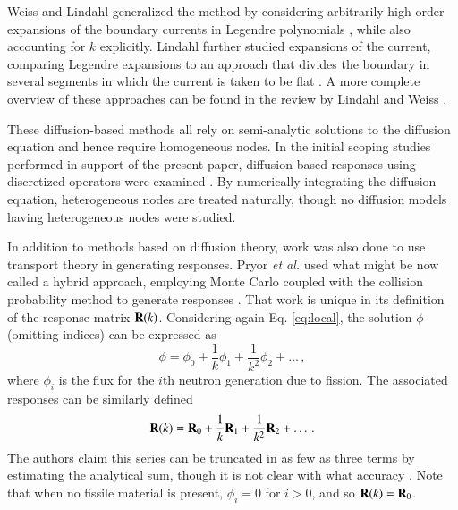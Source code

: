 Weiss and Lindahl generalized the method by considering
arbitrarily high order expansions of the boundary
currents in Legendre polynomials \cite{weiss1975hor}, while also accounting 
for $k$ explicitly.
Lindahl further studied expansions of the current,
comparing Legendre expansions to an approach that
divides the boundary in several segments in which
the current is taken to be flat \cite{lindahl1976mdr}.  A more
complete overview of these approaches can be found
in the review by Lindahl
and Weiss \cite{lindahl1981rrm}.

These diffusion-based methods all rely on semi-analytic solutions to the 
diffusion equation and hence require homogeneous nodes. In the initial 
scoping studies performed in support of the present paper, diffusion-based 
responses using discretized operators were examined \cite{roberts2011ser}.  
By numerically integrating the diffusion equation, heterogeneous nodes 
are treated naturally, though no diffusion models having heterogeneous nodes 
were studied.

In addition to methods based on diffusion 
theory, work was also done to use transport theory
in generating responses.  Pryor {\it et al.} used
what might be now called a hybrid approach, employing
Monte Carlo coupled with the collision probability 
method to generate responses \cite{pryor1973rmm, pryor1975rdr,
sicilian1975atr}.  That work is unique in its definition
of the response matrix $\mathbf{R}(k)$.  Considering again
 Eq. \ref{eq:local}, the solution $\phi$ (omitting 
indices) can
be expressed as
\begin{equation}
 \phi = \phi_{0} + \frac{1}{k}\phi_{1}
                 + \frac{1}{k^2}\phi_{2}  + \ldots \, ,
\end{equation}
where $\phi_{i} $ is the flux for the $i$th neutron
generation due to fission.  The 
associated responses can be similarly defined
\begin{equation}
 \mathbf{R}(k) = \mathbf{R}_0 + \frac{1}{k}\mathbf{R}_1
                 + \frac{1}{k^2}\mathbf{R}_2  + \ldots \, .
\label{eq:responsesum}
\end{equation}
The authors claim this series can be truncated in
as few as three terms by estimating the analytical
sum, though it is not clear with what accuracy
 \cite{sicilian1975atr}.  Note that when
 no fissile material
is present, $\phi_{i} = 0$ for $i > 0$, and so
$\mathbf{R}(k) = \mathbf{R}_0$.


